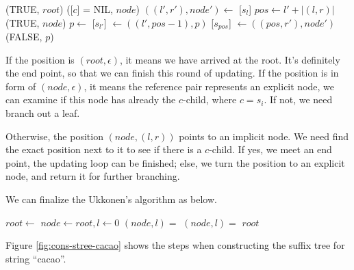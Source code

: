 \documentclass[UTF8]{article}
\begin{document}
\begin{algorithmic}
      \State \Return (TRUE, $root$)
    \Else
      \State \Return ([$c$] = NIL, $node$)
    \EndIf
  \Else
    \State $((l', r'), node') \gets$ [$s_l$]
    \State $pos \gets l' + |(l, r)|$
      \State \Return (TRUE, $node$)
    \Else
      \State $p \gets$ 
      \State {}[$s_{l'}$] $\gets ((l', pos-1), p)$
      \State {}[$s_{pos}$] $\gets ((pos, r'), node')$
      \State \Return (FALSE, $p$)
    \EndIf
  \EndIf
\EndFunction
\end{algorithmic}

If the position is $(root, \epsilon)$, it means we have arrived at the root.
It's definitely the end point, so that we can finish this round of updating.
If the position is in form of $(node, \epsilon)$, it means the reference pair represents
an explicit node, we can examine if this node has already the $c$-child, where $c=s_i$.
If not, we need branch out a leaf.

Otherwise, the position $(node, (l, r))$ points to an implicit node.
We need find the exact position next to it to see if there is a $c$-child.
If yes, we meet an end point, the updating loop can be finished; else, we turn
the position to an explicit node, and return it for further branching.

We can finalize the Ukkonen's algorithm as below.

\begin{algorithmic}[1]
  \State $root \gets$ 
  \State $node \gets root, l \gets 0$
    \State $(node, l) = $ 
    \State $(node, l) = $ 
  \EndFor
  \State \Return $root$
\EndFunction
\end{algorithmic}

Figure \ref{fig:cons-stree-cacao} shows the steps when constructing the
suffix tree for string ``cacao''.
\end{document}
